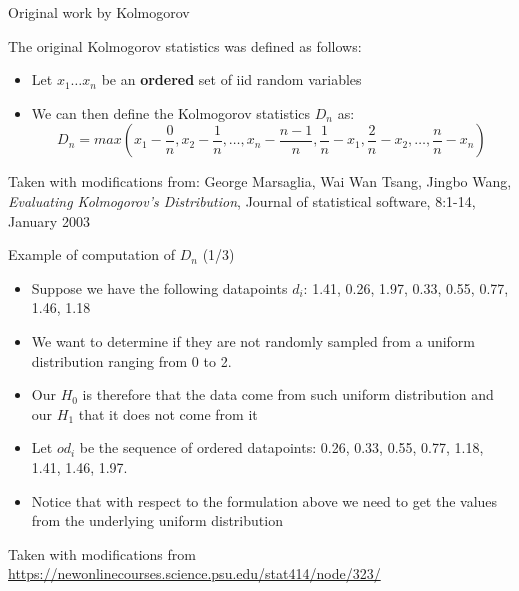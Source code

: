 \documentclass{beamer}
\begin{document}
\begin{frame}
{\centerline{Original work by Kolmogorov}}

The original Kolmogorov statistics was defined as follows:
\begin{itemize}
    \item Let $x_1 \ldots x_n$ be an \textbf{ordered} set of iid random variables
    \item We can then define the Kolmogorov statistics $D_{n}$ as:
    $$D_{n} = max(x_1 - \frac{0}{n}, x_2 - \frac{1}{n}, \ldots, x_n - \frac{n-1}{n}, \frac{1}{n} - x_1, \frac{2}{n} - x_2, \ldots, \frac{n}{n} - x_n )$$

\end{itemize}


\begin{center}
\tiny{Taken with modifications from: George Marsaglia, Wai Wan Tsang, Jingbo Wang, \textit{Evaluating Kolmogorov’s Distribution}, Journal of statistical software, 8:1-14, January 2003}
\end{center}

\end{frame}


\begin{frame}
{\centerline{Example of computation of $D_n$ (1/3)}}

\begin{itemize}
   \item Suppose we have the following datapoints $d_i$: 1.41, 0.26, 1.97, 0.33, 0.55, 0.77, 1.46, 1.18
   \item We want to determine if they are not randomly sampled from a uniform distribution ranging from 0 to 2.
   \item Our $H_0$ is therefore that the data come from such uniform distribution and our $H_1$ that it does not come from it
   \item Let $od_i$ be the sequence of ordered datapoints: 0.26, 0.33, 0.55, 0.77, 1.18, 1.41, 1.46, 1.97.
   \item Notice that with respect to the formulation above we need to get the values from the underlying uniform distribution
\end{itemize}

\begin{center}
\tiny{Taken with modifications from \url{https://newonlinecourses.science.psu.edu/stat414/node/323/}}
\end{center}
\end{frame}
\end{document}
